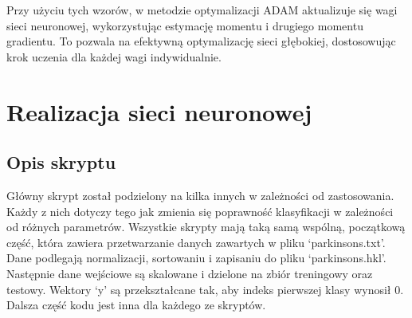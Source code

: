 \documentclass[a4paper]{article}
\begin{document}
Przy użyciu tych wzorów, w metodzie optymalizacji ADAM aktualizuje się wagi sieci neuronowej, wykorzystując estymację momentu i drugiego momentu gradientu.
To pozwala na efektywną optymalizację sieci głębokiej, dostosowując krok uczenia dla każdej wagi indywidualnie.

\newpage
\section{Realizacja sieci neuronowej}
\subsection{Opis skryptu}

Główny skrypt został podzielony na kilka innych w zależności od zastosowania.
Każdy z nich dotyczy tego jak zmienia się poprawność klasyfikacji w zależności od różnych parametrów.
Wszystkie skrypty mają taką samą wspólną, początkową część, która zawiera przetwarzanie danych zawartych w pliku `parkinsons.txt'.
Dane podlegają normalizacji, sortowaniu i zapisaniu do pliku `parkinsons.hkl'.
Następnie dane wejściowe są skalowane i dzielone na zbiór treningowy oraz testowy.
Wektory `y' są przekształcane tak, aby indeks pierwszej klasy wynosił 0.
Dalsza część kodu jest inna dla każdego ze skryptów.
\end{document}
